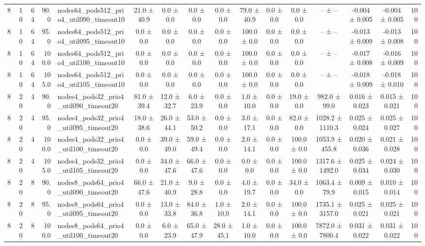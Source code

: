 \begin{tabular}{r r r r l c c c c c c c c c c r}
8 & 10 & 64 & 90.0 & nodes64\_pods512\_prio4\_util090\_timeout10 & 21.0 ± 40.9 & 0.0 ± 0.0 & 0.0 ± 0.0 & 0.0 ± 0.0 & 79.0 ± 40.9 & 0.0 ± 0.0 & 0.0 ± 0.0 & -- ± -- & -0.004 ± 0.005 & -0.004 ± 0.005 & 100 \\
8 & 10 & 64 & 95.0 & nodes64\_pods512\_prio4\_util095\_timeout10 & 0.0 ± 0.0 & 0.0 ± 0.0 & 0.0 ± 0.0 & 0.0 ± 0.0 & 100.0 ± 0.0 & 0.0 ± 0.0 & 0.0 ± 0.0 & -- ± -- & -0.013 ± 0.009 & -0.013 ± 0.008 & 100 \\
8 & 10 & 64 & 100.0 & nodes64\_pods512\_prio4\_util100\_timeout10 & 0.0 ± 0.0 & 0.0 ± 0.0 & 0.0 ± 0.0 & 0.0 ± 0.0 & 100.0 ± 0.0 & 0.0 ± 0.0 & 0.0 ± 0.0 & -- ± -- & -0.017 ± 0.008 & -0.016 ± 0.009 & 100 \\
8 & 10 & 64 & 105.0 & nodes64\_pods512\_prio4\_util105\_timeout10 & 0.0 ± 0.0 & 0.0 ± 0.0 & 0.0 ± 0.0 & 0.0 ± 0.0 & 100.0 ± 0.0 & 0.0 ± 0.0 & 0.0 ± 0.0 & -- ± -- & -0.018 ± 0.009 & -0.018 ± 0.010 & 100 \\
8 & 20 & 4 & 90.0 & nodes4\_pods32\_prio4\_util090\_timeout20 & 81.0 ± 39.4 & 12.0 ± 32.7 & 6.0 ± 23.9 & 0.0 ± 0.0 & 1.0 ± 10.0 & 0.0 ± 0.0 & 19.0 ± 0.0 & 982.0 ± 99.0 & 0.016 ± 0.023 & 0.015 ± 0.021 & 100 \\
8 & 20 & 4 & 95.0 & nodes4\_pods32\_prio4\_util095\_timeout20 & 18.0 ± 38.6 & 26.0 ± 44.1 & 53.0 ± 50.2 & 0.0 ± 0.0 & 3.0 ± 17.1 & 0.0 ± 0.0 & 82.0 ± 0.0 & 1028.2 ± 1110.3 & 0.025 ± 0.024 & 0.025 ± 0.027 & 100 \\
8 & 20 & 4 & 100.0 & nodes4\_pods32\_prio4\_util100\_timeout20 & 0.0 ± 0.0 & 39.0 ± 49.0 & 59.0 ± 49.4 & 0.0 ± 0.0 & 2.0 ± 14.1 & 0.0 ± 0.0 & 100.0 ± 0.0 & 1053.9 ± 455.8 & 0.020 ± 0.036 & 0.021 ± 0.028 & 100 \\
8 & 20 & 4 & 105.0 & nodes4\_pods32\_prio4\_util105\_timeout20 & 0.0 ± 0.0 & 34.0 ± 47.6 & 66.0 ± 47.6 & 0.0 ± 0.0 & 0.0 ± 0.0 & 0.0 ± 0.0 & 100.0 ± 0.0 & 1317.6 ± 1492.0 & 0.025 ± 0.034 & 0.024 ± 0.030 & 100 \\
8 & 20 & 8 & 90.0 & nodes8\_pods64\_prio4\_util090\_timeout20 & 66.0 ± 47.6 & 21.0 ± 40.9 & 9.0 ± 28.8 & 0.0 ± 0.0 & 4.0 ± 19.7 & 0.0 ± 0.0 & 34.0 ± 0.0 & 1063.4 ± 79.9 & 0.009 ± 0.015 & 0.010 ± 0.014 & 100 \\
8 & 20 & 8 & 95.0 & nodes8\_pods64\_prio4\_util095\_timeout20 & 0.0 ± 0.0 & 13.0 ± 33.8 & 84.0 ± 36.8 & 1.0 ± 10.0 & 2.0 ± 14.1 & 0.0 ± 0.0 & 100.0 ± 0.0 & 1735.1 ± 3157.0 & 0.025 ± 0.021 & 0.025 ± 0.021 & 100 \\
8 & 20 & 8 & 100.0 & nodes8\_pods64\_prio4\_util100\_timeout20 & 0.0 ± 0.0 & 6.0 ± 23.9 & 65.0 ± 47.9 & 28.0 ± 45.1 & 1.0 ± 10.0 & 0.0 ± 0.0 & 100.0 ± 0.0 & 7872.0 ± 7800.4 & 0.031 ± 0.022 & 0.031 ± 0.022 & 100 \\

\end{tabular}
